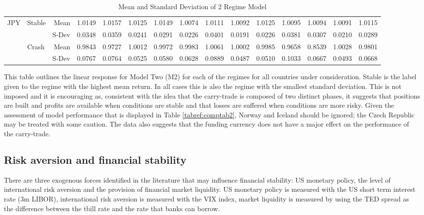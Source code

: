 \documentclass[12pt, a4paper, oneside]{article}\usepackage[]{graphicx}\usepackage[]{color}
\begin{document}
\begin{landscape}
\begin{table}[ht]
\begin{threeparttable}
\begin{tabular}{llrrrrrrrrrrrrr}
\hline  
  \multirow{4}{*}{JPY}&\multirow{2}{*}{Stable}& Mean& 1.0149 & 1.0157 & 1.0125 & 1.0149 & 1.0074 & 1.0111 & 1.0092 & 1.0125 & 1.0095 & 1.0094 & 1.0091 & 1.0115 \\ 
 & & S-Dev &0.0348 & 0.0359 & 0.0241 & 0.0291 & 0.0226 & 0.0401 & 0.0191 & 0.0226 & 0.0381 & 0.0307 & 0.0210 & 0.0289 \\ 
  & \multirow{2}{*}{Crash}&Mean & 0.9843 & 0.9727 & 1.0012 & 0.9972 & 0.9983 & 1.0061 & 1.0002 & 0.9985 & 0.9658 & 0.8539 & 1.0028 & 0.9801 \\ 
  & & S-Dev& 0.0767 & 0.0764 & 0.0525 & 0.0580 & 0.0628 & 0.0889 & 0.0487 & 0.0510 & 0.1033 & 0.0667 & 0.0493 & 0.0668 \\ 
   \hline
\end{tabular}
\begin{tablenotes}
\small
\item
This table outlines the linear response for Model Two (M2) for each of the regimes for all countries under consideration.  Stable is the label given to the regime with the highest mean return.  In all cases this is also the regime with the smallest standard deviation. This is not imposed and it is encouraging as, consistent with the idea that the carry-trade is composed of two distinct phases, it suggests that positions are built and profits are available when conditions are stable and that losses are suffered when conditions are more risky.  Given the assessment of model performance that is displayed in Table \ref{tabref:comptab2}, Norway and Iceland should be ignored; the Czech Republic may be treated with some caution.  The data also suggests that the funding currency does not have a major effect on the performance of the carry-trade.   
\end{tablenotes}
\caption{Mean and Standard Deviation of 2 Regime Model}
\label{tabref:2stateresponse}
\end{threeparttable}
\end{table}
\end{landscape}

\subsection{Risk aversion and financial stability}
There are three exogenous forces identified in the literature that may influence financial stability:  US monetary policy, the level of international risk aversion and the provision of financial market liquidity.  US monetary policy is measured with the US short term interest rate (3m LIBOR),  international risk aversion is measured with the VIX index, market liquidity is measured by using the TED spread as the difference between the tbill rate and the rate that banks can borrow.   
\end{document}
